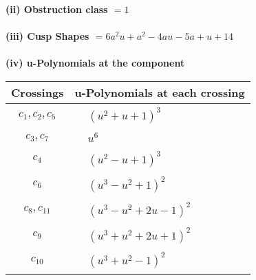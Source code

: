 \documentclass[1p]{elsarticle_modified}
\theoremstyle{definition}
\begin{document}
\flushleft \textbf{(ii) Obstruction class $= 1$}\\~\\
\flushleft \textbf{(iii) Cusp Shapes $= 6 a^2 u+a^2-4 a u-5 a+u+14$}\\~\\
\newpage\renewcommand{\arraystretch}{1}
\flushleft \textbf{(iv) u-Polynomials at the component}\newline \\
\begin{tabular}{m{50pt}|m{274pt}}
Crossings & \hspace{64pt}u-Polynomials at each crossing \\
\hline $$\begin{aligned}c_{1},c_{2},c_{5}\end{aligned}$$&$\begin{aligned}
&(u^2+u+1)^3
\end{aligned}$\\
\hline $$\begin{aligned}c_{3},c_{7}\end{aligned}$$&$\begin{aligned}
&u^6
\end{aligned}$\\
\hline $$\begin{aligned}c_{4}\end{aligned}$$&$\begin{aligned}
&(u^2- u+1)^3
\end{aligned}$\\
\hline $$\begin{aligned}c_{6}\end{aligned}$$&$\begin{aligned}
&(u^3- u^2+1)^2
\end{aligned}$\\
\hline $$\begin{aligned}c_{8},c_{11}\end{aligned}$$&$\begin{aligned}
&(u^3- u^2+2 u-1)^2
\end{aligned}$\\
\hline $$\begin{aligned}c_{9}\end{aligned}$$&$\begin{aligned}
&(u^3+u^2+2 u+1)^2
\end{aligned}$\\
\hline $$\begin{aligned}c_{10}\end{aligned}$$&$\begin{aligned}
&(u^3+u^2-1)^2
\end{aligned}$\\
\hline
\end{tabular}\\~\\
\end{document}
